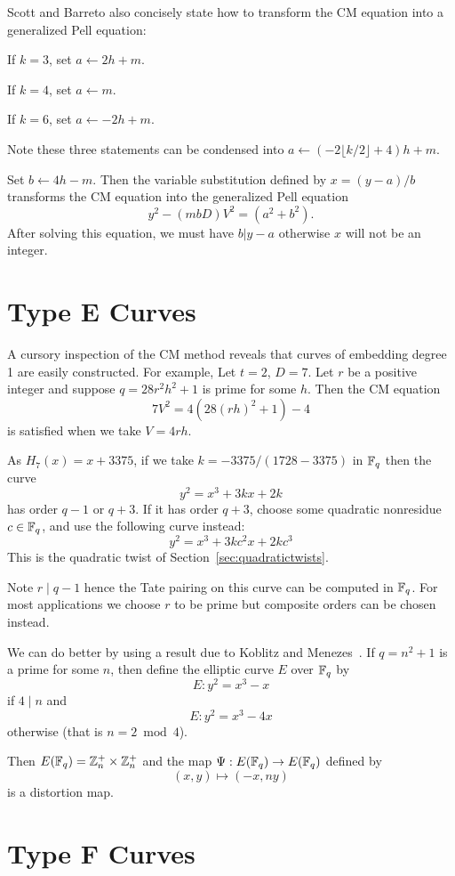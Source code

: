 Scott and Barreto also concisely state how to transform the CM equation
into a generalized Pell equation:

If $k = 3$, set $a \gets 2h + m$.

If $k = 4$, set $a \gets m$.

If $k = 6$, set $a \gets -2h + m$.

Note these three statements can be condensed into
$a \gets (-2 \lfloor k/2 \rfloor + 4)h + m$.

Set $b \gets 4h - m$. Then the variable substitution
defined by $x = (y-a)/b$ transforms the CM equation into the generalized
Pell equation
\[ y^2 - (mbD)V^2 = (a^2 + b^2) .\]
After solving this equation, we must have $b | y - a$ otherwise $x$ will
not be an integer.

\section {Type E Curves}

A cursory inspection of the CM method reveals that
curves of embedding degree 1 are easily constructed. For example,
Let $t = 2$, $D = 7$. Let $r$ be a positive integer
and suppose $q = 28 r^2 h^2 + 1$ is prime for some $h$.
Then the CM equation
\[
7 V^2 = 4 (28 (r h)^2 + 1) - 4
\]
is satisfied when we take $V = 4 r h$.

As $H_7(x) = x + 3375$, if we take $k = -3375 / (1728 - 3375)$ in $\mathbb{F}_q$
then the curve
\[
y^2 = x^3 + 3k x + 2k
\]
has order $q - 1$ or $q + 3$. If it has order $q+3$, choose some
quadratic nonresidue $c \in \mathbb{F}_q$, and use the following curve instead:
\[ y^2 = x^3 + 3 k c^2 x + 2 k c^3 \]
This is the quadratic twist of Section~\ref{sec:quadratictwists}.

Note $r \mid q-1$ hence the Tate pairing on this curve can be computed
in $\mathbb{F}_q$. For most applications we choose $r$ to be prime but composite
orders can be chosen instead.

We can do better by using a result due to Koblitz and Menezes~\cite{km}.
If $q = n^2 + 1$ is a prime for some $n$, then define the elliptic curve
$E$ over $\mathbb{F}_q$ by
\[E:y^2 = x^3  - x\]
if $4 \mid n$ and
\[E:y^2 = x^3 - 4x\]
otherwise (that is $n = 2 \bmod 4$).

Then $E(\mathbb{F}_q) = \mathbb{Z}_n^+ \times \mathbb{Z}_n^+$ and the map
$\Psi:E(\mathbb{F}_q) \rightarrow E(\mathbb{F}_q)$
defined by
\[(x,y) \mapsto (-x, ny)\]
is a distortion map.

\section {Type F Curves}

